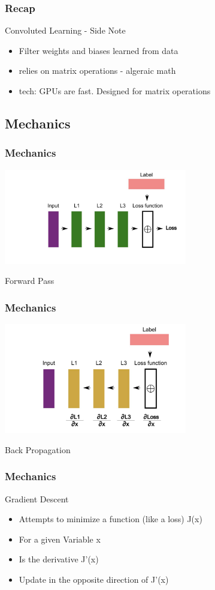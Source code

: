\documentclass[aspectratio=169,usenames,dvipsnames]{beamer}
\begin{document}
\begin{frame}
    \frametitle{Recap}
    \begin{block}{Convoluted Learning - Side Note}
        \begin{itemize}
            \item Filter weights and biases learned from data
            \item relies on matrix operations - algeraic math
            \item tech: GPUs are fast. Designed for matrix operations
        \end{itemize}
    \end{block}
\end{frame}
\subsection{Mechanics}
\begin{frame}
    \frametitle{Mechanics}
    \centering
    \includegraphics[width=0.6\textwidth]{Figures/forward_pass.png}
    \begin{block}{Forward Pass}
    \end{block}
\end{frame}
\begin{frame}
    \frametitle{Mechanics}
    \centering
    \includegraphics[width=0.6\textwidth]{Figures/back_prop.png}
    \begin{block}{Back Propagation}
    \end{block}
\end{frame}
\begin{frame}
    \frametitle{Mechanics}
    \begin{block}{Gradient Descent}
        \begin{itemize}
            \item Attempts to minimize a function (like a loss) J(x)
            \item For a given Variable x
            \item Is the derivative J'(x) 
            \item Update in the opposite direction of J'(x)
        \end{itemize}
    \end{block}
\end{frame}
\end{document}
